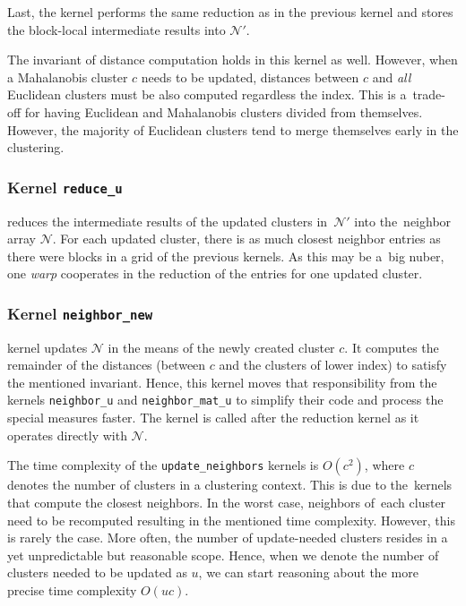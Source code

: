 Last, the kernel performs the same reduction as in the previous kernel and stores the block-local intermediate results into $\mathcal{N}'$.

\begin{rem}
	The invariant of distance computation holds in this kernel as well. However, when a Mahalanobis cluster $c$ needs to be updated, distances between $c$ and \emph{all} Euclidean clusters must be also computed regardless the index. This is a~trade-off for having Euclidean and Mahalanobis clusters divided from themselves. However, the majority of Euclidean clusters tend to merge themselves early in the clustering.
\end{rem}

\subsubsection{Kernel \texttt{reduce\_u}}  reduces the intermediate results of the updated clusters in~$\mathcal{N}'$ into the~neighbor array $\mathcal{N}$. For each updated cluster, there is as much closest neighbor entries as there were blocks in a grid of the previous kernels. As this may be a~big nuber, one \emph{warp} cooperates in the reduction of the entries for one updated cluster.

\subsubsection{Kernel \texttt{neighbor\_new}}  kernel updates $\mathcal{N}$ in the means of the newly created cluster $c$. It computes the remainder of the distances (between $c$ and the clusters of lower index) to satisfy the mentioned invariant. Hence, this kernel moves that responsibility from the kernels \texttt{neighbor\_u} and \texttt{neighbor\_mat\_u} to simplify their code and process the special measures faster. The kernel is called after the reduction kernel as it operates directly with $\mathcal{N}$. 

\begin{rem}
	The time complexity of the \texttt{update\_neighbors} kernels is $O(c^2)$, where $c$ denotes the number of clusters in a clustering context. This is due to the~kernels that compute the closest neighbors. In the worst case, neighbors of~each cluster need to be recomputed resulting in the mentioned time complexity. However, this is rarely the case. More often, the number of update-needed clusters resides in a yet unpredictable but reasonable scope. Hence, when we denote the number of clusters needed to be updated as $u$, we can start reasoning about the more precise time complexity $O(uc)$.
\end{rem}
